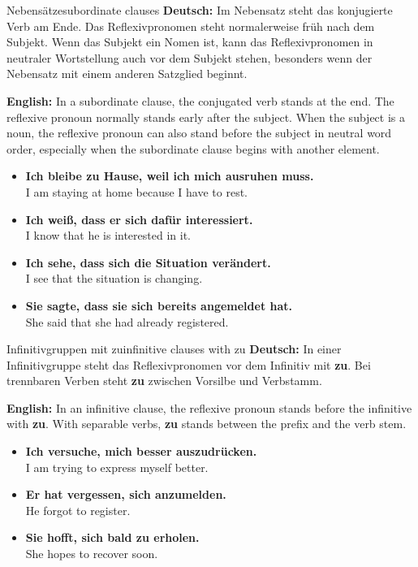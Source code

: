 \documentclass[a4paper,11pt]{article}
\newcommand{\GermanText}[1]{\textbf{Deutsch: }#1\par}
\newcommand{\EnglishText}[1]{{\small\color{SoftGray}\textbf{English: }#1\par}}
\newcommand{\ExampleItem}[2]{\item \textbf{#1}\\{\small\color{SoftGray}#2}}
\begin{document}
        \begin{grammarentry}{Nebensätze}{subordinate clauses}
            \GermanText{Im Nebensatz steht das konjugierte Verb am Ende. Das Reflexivpronomen steht normalerweise früh nach dem Subjekt. Wenn das Subjekt ein Nomen ist, kann das Reflexivpronomen in neutraler Wortstellung auch vor dem Subjekt stehen, besonders wenn der Nebensatz mit einem anderen Satzglied beginnt.}
            \EnglishText{In a subordinate clause, the conjugated verb stands at the end. The reflexive pronoun normally stands early after the subject. When the subject is a noun, the reflexive pronoun can also stand before the subject in neutral word order, especially when the subordinate clause begins with another element.}

            \begin{exbox}
                \begin{itemize}
                    \ExampleItem{Ich bleibe zu Hause, weil ich mich ausruhen muss.}{I am staying at home because I have to rest.}
                    \ExampleItem{Ich weiß, dass er sich dafür interessiert.}{I know that he is interested in it.}
                    \ExampleItem{Ich sehe, dass sich die Situation verändert.}{I see that the situation is changing.}
                    \ExampleItem{Sie sagte, dass sie sich bereits angemeldet hat.}{She said that she had already registered.}
                \end{itemize}
            \end{exbox}
        \end{grammarentry}

        \begin{grammarentry}{Infinitivgruppen mit zu}{infinitive clauses with zu}
            \GermanText{In einer Infinitivgruppe steht das Reflexivpronomen vor dem Infinitiv mit \textbf{zu}. Bei trennbaren Verben steht \textbf{zu} zwischen Vorsilbe und Verbstamm.}
            \EnglishText{In an infinitive clause, the reflexive pronoun stands before the infinitive with \textbf{zu}. With separable verbs, \textbf{zu} stands between the prefix and the verb stem.}

            \begin{exbox}
                \begin{itemize}
                    \ExampleItem{Ich versuche, mich besser auszudrücken.}{I am trying to express myself better.}
                    \ExampleItem{Er hat vergessen, sich anzumelden.}{He forgot to register.}
                    \ExampleItem{Sie hofft, sich bald zu erholen.}{She hopes to recover soon.}
                \end{itemize}
            \end{exbox}
        \end{grammarentry}
\end{document}
